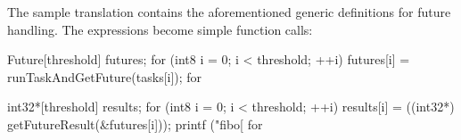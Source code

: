 The sample translation contains the aforementioned generic definitions for future handling. The expressions become simple function calls:
\begin{ccode}
Future[threshold] futures; 
for (int8 i = 0; i < threshold; ++i) { 
  futures[i] = runTaskAndGetFuture(tasks[i]); 
} for 
 
int32*[threshold] results; 
for (int8 i = 0; i < threshold; ++i) { 
  results[i] = ((int32*) getFutureResult(&futures[i])); 
  printf ("fibo[%
} for
\end{ccode}